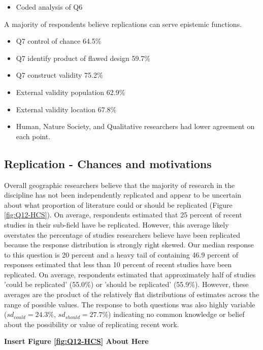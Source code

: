 \documentclass[]{interact}
\theoremstyle{plain}%
\theoremstyle{definition}
\theoremstyle{remark}
\begin{document}
\begin{itemize}
    \item Coded analysis of Q6
\end{itemize}

A majority of respondents believe replications can serve epistemic functions.
\begin{itemize}
    \item Q7 control of chance 64.5\%
    \item Q7 identify product of flawed design 59.7\%
    \item Q7 construct validity 75.2\%
    \item External validity population 62.9\%
    \item External validity location 67.8\%
    \item Human, Nature Society, and Qualitative researchers had lower agreement on each point.
\end{itemize}

\subsection*{Replication - Chances and motivations}
Overall geographic researchers believe that the majority of research in the discipline has not been independently replicated and appear to be uncertain about what proportion of literature could or should be replicated (Figure \ref{fig:Q12-HCS}). 
On average, respondents estimated that 25 percent of recent studies in their sub-field have be replicated. 
However, this average likely overstates the percentage of studies researchers believe have been replicated because the response distribution is strongly right skewed.
Our median response to this question is 20 percent and a heavy tail of containing 46.9 percent of responses estimated that less than 10 percent of recent studies have been replicated.
On average, respondents estimated that approximately half of studies 'could be replicated' (55.0\%) or 'should be replicated' (55.9\%). 
However, these averages are the product of the relatively flat distributions of estimates across the range of possible values. 
The response to both questions was also highly variable (\textit{$sd_{could}=24.3\%$}, \textit{$sd_{should}=27.7\%$}) indicating no common knowledge or belief about the possibility or value of replicating recent work.  

\begin{center}
\textbf{Insert Figure \ref{fig:Q12-HCS} About Here}
\end{center}
\end{document}
